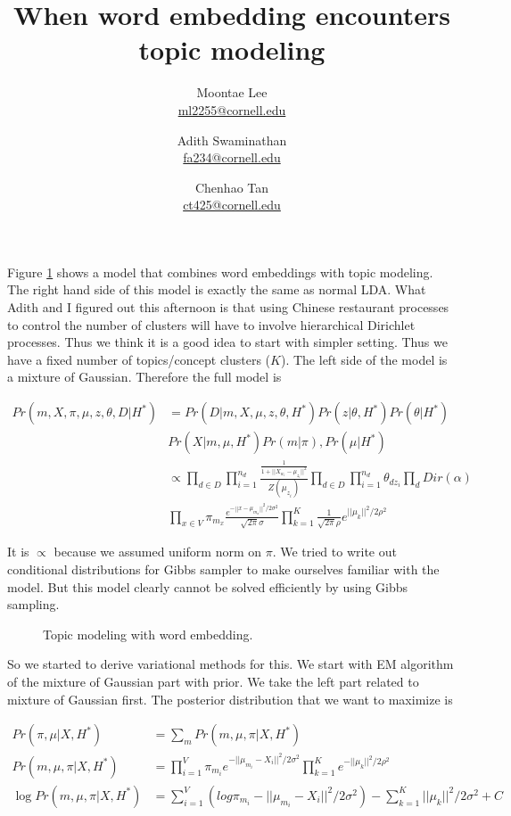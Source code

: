 \documentclass[letterpaper]{article}
\title{When word embedding encounters topic modeling}
\author{%
  Moontae Lee \\ \href{ml2255@cornell.edu}{ml2255@cornell.edu}
  \and Adith Swaminathan\\ \href{fa234@cornell.edu}{fa234@cornell.edu}
  \and Chenhao Tan\\ \href{chenhao@cs.cornell.edu}{ct425@cornell.edu} 
}
\theoremstyle{plain} \numberwithin{equation}{section}
\theoremstyle{definition}
\newcommand{\hyper}{H^*}
\newcommand{\nd}{n_d}
\newcommand{\htd}[2]{\frac{1}{1+||#1-#2||^2}}
\newcommand{\htdnorm}[1]{Z(#1)}
\newcommand{\Xwi}{X_{w_i}}
\newcommand{\muzi}{\mu_{z_i}}
\newcommand{\norm}[1]{||#1||^2}
\begin{document}
\maketitle

Figure \ref{fig:tw_model} shows a model that combines word embeddings with topic modeling. The right hand side of this model is exactly the same as normal LDA. What Adith and I figured out this afternoon is that using Chinese restaurant processes to control the number of clusters will have to involve hierarchical Dirichlet processes. Thus we think it is a good idea to start with simpler setting. Thus we have a fixed number of topics/concept clusters ($K$).
The left side of the model is a mixture of Gaussian. Therefore the full model is

\begin{align}
Pr(m, X, \pi, \mu, z, \theta, D|\hyper) & = Pr(D|m,X,\mu,z,\theta,\hyper)Pr(z|\theta, \hyper) Pr(\theta|\hyper) \nonumber\\
& Pr(X|m,\mu,\hyper) Pr(m|\pi), Pr(\mu|\hyper) \nonumber\\
& \propto \prod_{d\in D}\prod_{i=1}^{\nd}\frac{\htd{\Xwi}{\muzi}}{\htdnorm{\muzi}} \prod_{d\in D}\prod_{i=1}^{\nd} \theta_{dz_i} \prod_{d} Dir(\alpha) \nonumber \\
& \prod_{x \in V} \pi_{m_x} \frac{e^{-||x-\mu_{m_x}||^2/2\sigma^2}}{\sqrt{2\pi}\sigma} \prod_{k=1}^K \frac{1}{\sqrt{2\pi} \rho} e^{||\mu_k||^2/2\rho^2}
\end{align}


It is $\propto$ because we assumed uniform norm on $\pi$. We tried to write out conditional distributions for Gibbs sampler to make ourselves familiar with the model. But this model clearly cannot be solved efficiently by using Gibbs sampling. 

\begin{figure}[ht]
\begin{center}

\end{center}
\caption{Topic modeling with word embedding.\label{fig:tw_model}}
\end{figure}


So we started to derive variational methods for this. We start with EM algorithm of the mixture of Gaussian part with prior.
We take the left part related to mixture of Gaussian first.
The posterior distribution that we want to maximize is

\begin{align}
Pr(\pi, \mu|X, \hyper) & = \sum_m Pr(m, \mu, \pi|X, \hyper) \nonumber\\
Pr(m, \mu, \pi|X, \hyper) &= \prod_{i=1}^V \pi_{m_i} e^{-\norm{\mu_{m_i}-X_i}/2\sigma^2}\prod_{k=1}^K e^{-\norm{\mu_k}/2\rho^2} \nonumber\\
\log{Pr(m, \mu, \pi|X, \hyper)} &= \sum_{i=1}^{V}(log\pi_{m_i} - \norm{\mu_{m_i}-X_i}/2\sigma^2)-\sum_{k=1}^K \norm{\mu_k}/2\sigma^2 + C \nonumber
\end{align}
\end{document}
